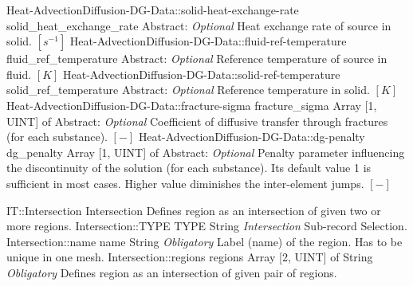 \begin{RecordType}
		\RecKey
			{Heat-AdvectionDiffusion-DG-Data::solid-heat-exchange-rate}
			{solid{\_}heat{\_}exchange{\_}rate}
			{{Abstract}{: }}
			{ \it{Optional} }
			{{{Heat exchange rate of source in solid. }{$[s^{-1}]$}}}
		\RecKey
			{Heat-AdvectionDiffusion-DG-Data::fluid-ref-temperature}
			{fluid{\_}ref{\_}temperature}
			{{Abstract}{: }}
			{ \it{Optional} }
			{{{Reference temperature of source in fluid. }{$[K]$}}}
		\RecKey
			{Heat-AdvectionDiffusion-DG-Data::solid-ref-temperature}
			{solid{\_}ref{\_}temperature}
			{{Abstract}{: }}
			{ \it{Optional} }
			{{{Reference temperature in solid. }{$[K]$}}}
		\RecKey
			{Heat-AdvectionDiffusion-DG-Data::fracture-sigma}
			{fracture{\_}sigma}
			{{Array [1, UINT] of }{Abstract}{: }}
			{ \it{Optional} }
			{{{Coefficient of diffusive transfer through fractures (for each substance). }{$[-]$}}}
		\RecKey
			{Heat-AdvectionDiffusion-DG-Data::dg-penalty}
			{dg{\_}penalty}
			{{Array [1, UINT] of }{Abstract}{: }}
			{ \it{Optional} }
			{{{Penalty parameter influencing the discontinuity of the solution (for each substance). Its default value 1 is sufficient in most cases. Higher value diminishes the inter-element jumps. }{$[-]$}}}
\end{RecordType}
\begin{RecordType}
	{IT::Intersection}
	{Intersection}
	{} %
	{} %
	{{{Defines region as an intersection of given two or more regions.}}}
		\RecKey
			{Intersection::TYPE}
			{TYPE}
			{{String}}
			{ \it{Intersection} }
			{{{Sub-record Selection.}}}
		\RecKey
			{Intersection::name}
			{name}
			{{String}}
			{ \it{Obligatory} }
			{{{Label (name) of the region. Has to be unique in one mesh.}}}
		\RecKey
			{Intersection::regions}
			{regions}
			{{Array [2, UINT] of }{String}}
			{ \it{Obligatory} }
			{{{Defines region as an intersection of given pair of regions.}}}
\end{RecordType}
